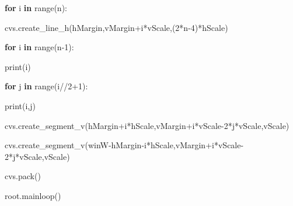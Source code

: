 \documentclass[
]{article}
\newenvironment{Shaded}{}{}
\newcommand{\BuiltInTok}[1]{#1}
\newcommand{\ControlFlowTok}[1]{\textcolor[rgb]{0.00,0.44,0.13}{\textbf{#1}}}
\newcommand{\DecValTok}[1]{\textcolor[rgb]{0.25,0.63,0.44}{#1}}
\newcommand{\KeywordTok}[1]{\textcolor[rgb]{0.00,0.44,0.13}{\textbf{#1}}}
\newcommand{\NormalTok}[1]{#1}
\newcommand{\OperatorTok}[1]{\textcolor[rgb]{0.40,0.40,0.40}{#1}}
\begin{document}
\begin{Shaded}
\begin{Highlighting}[]
    \ControlFlowTok{for}\NormalTok{ i }\KeywordTok{in} \BuiltInTok{range}\NormalTok{(n):
}
\NormalTok{        cvs.create\_line\_h(hMargin,vMargin}\OperatorTok{+}\NormalTok{i}\OperatorTok{*}\NormalTok{vScale,(}\DecValTok{2}\OperatorTok{*}\NormalTok{n}\OperatorTok{{-}}\DecValTok{4}\NormalTok{)}\OperatorTok{*}\NormalTok{hScale)
}
    \ControlFlowTok{for}\NormalTok{ i }\KeywordTok{in} \BuiltInTok{range}\NormalTok{(n}\OperatorTok{{-}}\DecValTok{1}\NormalTok{):
}
        \BuiltInTok{print}\NormalTok{(i)
}
        \ControlFlowTok{for}\NormalTok{ j }\KeywordTok{in} \BuiltInTok{range}\NormalTok{(i}\OperatorTok{//}\DecValTok{2}\OperatorTok{+}\DecValTok{1}\NormalTok{):
}
            \BuiltInTok{print}\NormalTok{(i,j)
}
\NormalTok{            cvs.create\_segment\_v(hMargin}\OperatorTok{+}\NormalTok{i}\OperatorTok{*}\NormalTok{hScale,vMargin}\OperatorTok{+}\NormalTok{i}\OperatorTok{*}\NormalTok{vScale}\OperatorTok{{-}}\DecValTok{2}\OperatorTok{*}\NormalTok{j}\OperatorTok{*}\NormalTok{vScale,vScale)
}
\NormalTok{            cvs.create\_segment\_v(winW}\OperatorTok{{-}}\NormalTok{hMargin}\OperatorTok{{-}}\NormalTok{i}\OperatorTok{*}\NormalTok{hScale,vMargin}\OperatorTok{+}\NormalTok{i}\OperatorTok{*}\NormalTok{vScale}\OperatorTok{{-}}\DecValTok{2}\OperatorTok{*}\NormalTok{j}\OperatorTok{*}\NormalTok{vScale,vScale)
}


\NormalTok{    cvs.pack()
}
\NormalTok{    root.mainloop() }
\end{Highlighting}
\end{Shaded}
\end{document}
